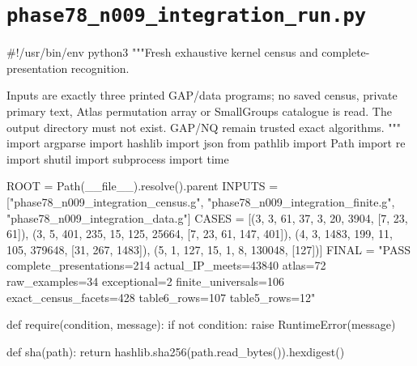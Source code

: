 \documentclass[11pt,a4paper]{article}
\begin{document}
\section*{\texttt{phase78\_n009\_integration\_run.py}}
\begin{CompleteProgram}
#!/usr/bin/env python3
"""Fresh exhaustive kernel census and complete-presentation recognition.

Inputs are exactly three printed GAP/data programs; no saved census, private
primary text, Atlas permutation array or SmallGroups catalogue is read.
The output directory must not exist. GAP/NQ remain trusted exact algorithms.
"""
import argparse
import hashlib
import json
from pathlib import Path
import re
import shutil
import subprocess
import time

ROOT = Path(__file__).resolve().parent
INPUTS = ["phase78_n009_integration_census.g", "phase78_n009_integration_finite.g", "phase78_n009_integration_data.g"]
CASES = [(3, 3, 61, 37, 3, 20, 3904, [7, 23, 61]), (3, 5, 401, 235, 15, 125, 25664, [7, 23, 61, 147, 401]), (4, 3, 1483, 199, 11, 105, 379648, [31, 267, 1483]), (5, 1, 127, 15, 1, 8, 130048, [127])]
FINAL = "PASS complete_presentations=214 actual_IP_meets=43840 atlas=72 raw_examples=34 exceptional=2 finite_universals=106 exact_census_facets=428 table6_rows=107 table5_rows=12"


def require(condition, message):
    if not condition:
        raise RuntimeError(message)


def sha(path):
    return hashlib.sha256(path.read_bytes()).hexdigest()



\end{CompleteProgram}
\end{document}
